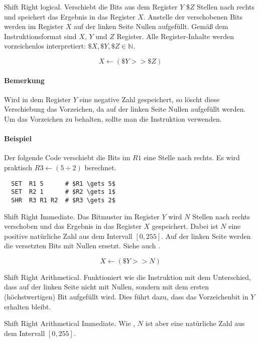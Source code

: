 \glqq Shift Right logical\grqq.
Verschiebt die Bits aus dem Register $Y$ $\$Z$ Stellen nach rechts und speichert
das Ergebnis in das Register $X$. Anstelle der verschobenen Bits werden im
Register $X$ auf der linken Seite Nullen aufgefüllt. Gemäß dem
Instruktionsformat  sind $X$, $Y$ und $Z$ Register. Alle
Register-Inhalte werden vorzeichenlos interpretiert: 
$\$X, \$Y, \$Z \in \mathds{N}$.

\[
    X \gets (\$Y >> \$Z)
\]



\paragraph{Bemerkung}
Wird in dem Register $Y$ eine negative Zahl gespeichert, so löscht diese
Verschiebung das Vorzeichen, da auf der linken Seite Nullen aufgefüllt werden.
Um das Vorzeichen zu behalten, sollte man die Instruktion 
verwenden.

\paragraph{Beispiel}
Der folgende Code verschiebt die Bits im $R1$ eine Stelle nach rechts.
Es wird praktisch $R3 \gets (5 \div 2)$ berechnet.
\begin{lstlisting}
  SET  R1 5      # $R1 \gets 5$
  SET  R2 1      # $R2 \gets 1$
  SHR  R3 R1 R2  # $R3 \gets 2$
\end{lstlisting}


\glqq Shift Right Immediate\grqq.
Das Bitmuster im Register $Y$ wird $N$ Stellen nach rechts verschoben und das
Ergebnis in das Register $X$ gespeichert.
Dabei ist $N$ eine positive natürliche Zahl aus dem Intervall $[0, 255]$.
Auf der linken Seite werden die versetzten Bits mit Nullen ersetzt.
Siehe auch .

\[
    X \gets (\$Y >> N)
\]

\glqq Shift Right Arithmetical\grqq.
Funktioniert wie die Instruktion  mit dem Unterschied, dass auf der
linken Seite nicht mit Nullen, sondern mit dem ersten (höchstwertigen) Bit
aufgefüllt wird. Dies führt dazu, dass das Vorzeichenbit in $Y$ erhalten
bleibt.


\glqq Shift Right Arithmetical Immediate\grqq.
Wie , $N$ ist aber eine natürliche Zahl aus dem Intervall
$[0, 255]$.



